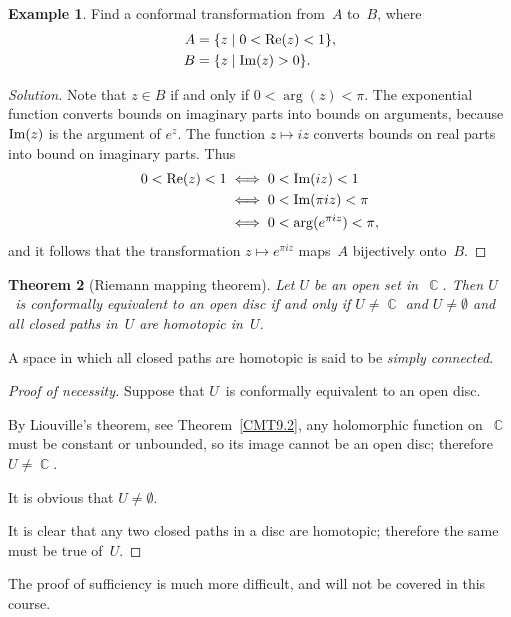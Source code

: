\documentclass{amsproc}
\newtheorem{theorem}{Theorem}[subsection]
\theoremstyle{definition}
\newtheorem{example}[theorem]{Example}
\newenvironment{solution}{\begin{proof}[Solution]}{\end{proof}}
\theoremstyle{remark}
\renewcommand{\Im}{\mathop{\textup{Im}}}
\renewcommand{\Re}{\mathop{\textup{Re}}}
\DeclareMathOperator{\C}{\mathbb{C}}
\numberwithin{equation}{section}
\begin{document}
\begin{example} \label{CME14.6}
Find a conformal transformation from~$ A $ to~$ B $, where
\begin{align*}
A &= \{z \mid 0 < \Re(z) < 1\}, \\
B &= \{z \mid \Im(z) > 0\}.
\end{align*}
\end{example}

\begin{solution}
Note that $ z \in B $ if and only if $ 0 < \arg(z) < \pi $. The exponential function converts bounds on imaginary parts into bounds on arguments, because $ \Im(z) $
is the argument of $ e^z $. The function $ z \mapsto iz $ converts bounds on real parts into bound on imaginary parts. Thus
\begin{align*}
0 < \Re(z) < 1
&\iff 0 < \Im(iz) < 1 \\
&\iff 0 < \Im(\pi iz) < \pi \\
&\iff 0 < \arg(e^{\pi iz}) < \pi,
\end{align*}
and it follows that the transformation $ z \mapsto e^{\pi iz} $ maps~$ A $ bijectively onto~$ B $.
\end{solution}

\begin{theorem}[Riemann mapping theorem] \label{CMT14.7}
Let $ U $ be an open set in~$ \C $. Then $ U $~is conformally equivalent to an open disc if and only if $ U \neq \C $ and $ U \neq \emptyset $ and all closed paths in~$ U $
are homotopic in~$ U $.
\end{theorem}

A space in which all closed paths are homotopic is said to be \emph{simply connected}.

\begin{proof}[Proof of necessity]
Suppose that $ U $~is conformally equivalent to an open disc.

By Liouville's theorem, see Theorem~\ref{CMT9.2}, any holomorphic function on~$ \C $ must be constant or unbounded, so its image cannot be an open disc; therefore $ U \neq \C $.

It is obvious that $ U \neq \emptyset $.

It is clear that any two closed paths in a disc are homotopic; therefore the same must be true of~$ U $.
\end{proof}

The proof of sufficiency is much more difficult, and will not be covered in this course.

\vfill
\pagebreak
\end{document}
